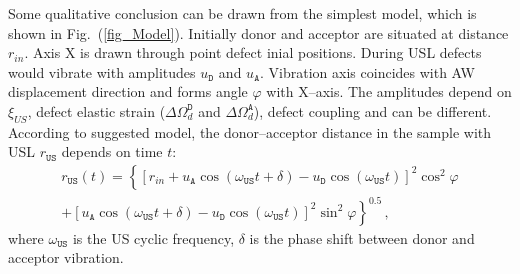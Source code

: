 \documentclass[aip,jap, amsmath,amssymb,reprint]{revtex4-1}
\begin{document}
Some qualitative conclusion can be drawn from the simplest model, which is shown in Fig.~(\ref{fig_Model}).
Initially donor and acceptor are situated at distance $r_{in}$.
Axis X is drawn through point defect inial positions.
During USL defects would vibrate with amplitudes $u_\mathtt{D}$ and $u_\mathtt{A}$.
Vibration axis coincides with AW displacement direction and forms angle $\varphi$ with  X--axis.
The amplitudes depend on $\xi_{U\!S}$, defect elastic strain ($\Delta\Omega_d^\mathtt{D}$ and $\Delta\Omega_d^\mathtt{A}$), defect coupling  and can be different.
According to suggested model, the donor--acceptor distance in the sample with USL $r_\mathtt{US}$ depends on time $t$:
\begin{multline}
\label{eqrUS}
r_\mathtt{US}(t)=\left\{[r_{in}+u_\mathtt{A}\cos(\omega_\mathtt{US}t+\delta)-u_\mathtt{D}\cos(\omega_\mathtt{US}t)]^2\cos^2\varphi \right.\\
    \left.+ [u_\mathtt{A}\cos(\omega_\mathtt{US}t+\delta)-u_\mathtt{D}\cos(\omega_\mathtt{US}t)]^2\sin^2\varphi\right\}^{0.5}\,,
\end{multline}
where $\omega_\mathtt{US}$ is the US cyclic frequency,
$\delta$ is the phase shift between donor and acceptor vibration.
\end{document}
